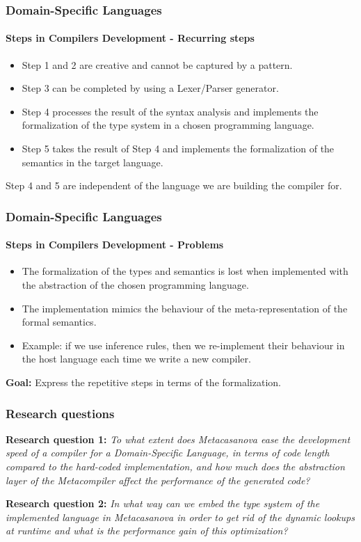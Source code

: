 \documentclass[10pt,a4paper]{beamer}
\begin{document}
\begin{frame}
\frametitle{Domain-Specific Languages}
\framesubtitle{Steps in Compilers Development - Recurring steps}
\begin{itemize}
	\item Step 1 and 2 are creative and cannot be captured by a pattern.
	\item Step 3 can be completed by using a Lexer/Parser generator.
	\item Step 4 processes the result of the syntax analysis and implements the formalization of the type system in a chosen programming language.
	\item Step 5 takes the result of Step 4 and implements the formalization of the semantics in the target language.
\end{itemize}

Step 4 and 5 are independent of the language we are building the compiler for.
\end{frame}

\begin{frame}
\frametitle{Domain-Specific Languages}
\framesubtitle{Steps in Compilers Development - Problems}
\begin{itemize}
	\item The formalization of the types and semantics is lost when implemented with the abstraction of the chosen programming language.
	\item The implementation mimics the behaviour of the meta-representation of the formal semantics.
	\item Example: if we use inference rules, then we re-implement their behaviour in the host language each time we write a new compiler.
\end{itemize}

\textbf{Goal:} Express the repetitive steps in terms of the formalization.
\end{frame}

\begin{frame}
\frametitle{Research questions}
\textbf{Research question 1:} \textit{To what extent does Metacasanova ease the development speed of a compiler for a Domain-Specific Language, in terms of code length compared to the hard-coded implementation, and how much does the abstraction layer of the Metacompiler affect the performance of the generated code?}
\pause

\vspace{0.2cm}
\noindent
\textbf{Research question 2:} \textit{In what way can we embed the type system of the implemented language in Metacasanova in order to get rid of the dynamic lookups at runtime and what is the performance gain of this optimization?}
\end{frame}
\end{document}
